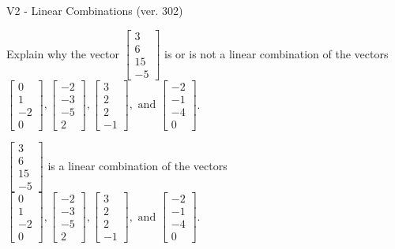 \begin{exercise}
  \begin{exerciseTitle}V2 - Linear Combinations (ver. 302)\end{exerciseTitle}
  \begin{exerciseStatement}
    Explain why the vector \(\left[\begin{array}{c}
3 \\
6 \\
15 \\
-5
\end{array}\right]\)  is or is not a linear 
	combination of the vectors \(\left[\begin{array}{c}
0 \\
1 \\
-2 \\
0
\end{array}\right] , \left[\begin{array}{c}
-2 \\
-3 \\
-5 \\
2
\end{array}\right] , \left[\begin{array}{c}
3 \\
2 \\
2 \\
-1
\end{array}\right] , \text{ and } \left[\begin{array}{c}
-2 \\
-1 \\
-4 \\
0
\end{array}\right]\).
	


  \end{exerciseStatement}
  \begin{exerciseAnswer}
   \(\left[\begin{array}{c}
3 \\
6 \\
15 \\
-5
\end{array}\right]\) 
  	 is  
	a linear combination of the vectors \(\left[\begin{array}{c}
0 \\
1 \\
-2 \\
0
\end{array}\right] , \left[\begin{array}{c}
-2 \\
-3 \\
-5 \\
2
\end{array}\right] , \left[\begin{array}{c}
3 \\
2 \\
2 \\
-1
\end{array}\right] , \text{ and } \left[\begin{array}{c}
-2 \\
-1 \\
-4 \\
0
\end{array}\right]\).


\end{exerciseAnswer}
\end{exercise}
